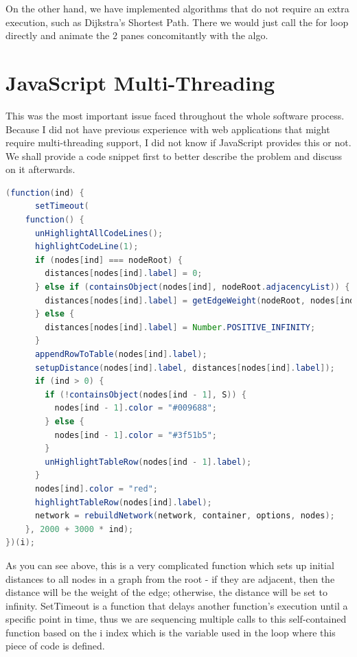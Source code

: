 \documentclass{l4proj}
\begin{document}
On the other hand, we have implemented algorithms that do not require an extra execution, such as Dijkstra's
Shortest Path. There we would just call the for loop directly and animate the 2 panes concomitantly with the algo.

\section{JavaScript Multi-Threading}

This was the most important issue faced throughout the whole software process. Because I did not have previous
experience with web applications that might require multi-threading support, I did not know if JavaScript provides this
or not. We shall provide a code snippet first to better describe the problem and discuss on it afterwards.

\begin{lstlisting}[language=Java, caption=Animation function used in Dijkstra's SP algorithm.]
(function(ind) {
      setTimeout(
	function() {
	  unHighlightAllCodeLines();
	  highlightCodeLine(1);
	  if (nodes[ind] === nodeRoot) {
	    distances[nodes[ind].label] = 0;
	  } else if (containsObject(nodes[ind], nodeRoot.adjacencyList)) {
	    distances[nodes[ind].label] = getEdgeWeight(nodeRoot, nodes[ind]);
	  } else {
	    distances[nodes[ind].label] = Number.POSITIVE_INFINITY;
	  }
	  appendRowToTable(nodes[ind].label);
	  setupDistance(nodes[ind].label, distances[nodes[ind].label]);
	  if (ind > 0) {
	    if (!containsObject(nodes[ind - 1], S)) {
	      nodes[ind - 1].color = "#009688";
	    } else {
	      nodes[ind - 1].color = "#3f51b5";
	    }
	    unHighlightTableRow(nodes[ind - 1].label);
	  }
	  nodes[ind].color = "red";
	  highlightTableRow(nodes[ind].label);
	  network = rebuildNetwork(network, container, options, nodes);
	}, 2000 + 3000 * ind);
})(i);
\end{lstlisting}

As you can see above, this is a very complicated function which sets up initial distances to all nodes in a graph from
the root - if they are adjacent, then the distance will be the weight of the edge; otherwise, the distance will be set
to infinity. SetTimeout is a function that delays another function's execution until a specific point in time, thus we are sequencing
multiple calls to this self-contained function based on the i index which is the variable used in the loop where
this piece of code is defined. 
\end{document}
